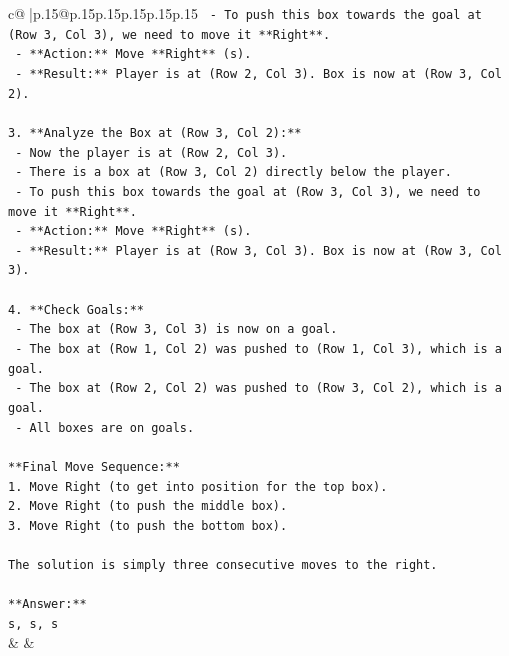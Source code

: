\documentclass{article}
\begin{document}
{\begin{supertabular}{c@{$\;$}|p{.15\linewidth}@{}p{.15\linewidth}p{.15\linewidth}p{.15\linewidth}p{.15\linewidth}p{.15\linewidth}}
{{{\texttt{    {-} To push this box towards the goal at (Row 3, Col 3), we need to move it **Right**.} \\
\texttt{    {-} **Action:** Move **Right** (s).} \\
\texttt{    {-} **Result:** Player is at (Row 2, Col 3). Box is now at (Row 3, Col 2).} \\
\\ 
\texttt{3.  **Analyze the Box at (Row 3, Col 2):**} \\
\texttt{    {-} Now the player is at (Row 2, Col 3).} \\
\texttt{    {-} There is a box at (Row 3, Col 2) directly below the player.} \\
\texttt{    {-} To push this box towards the goal at (Row 3, Col 3), we need to move it **Right**.} \\
\texttt{    {-} **Action:** Move **Right** (s).} \\
\texttt{    {-} **Result:** Player is at (Row 3, Col 3). Box is now at (Row 3, Col 3).} \\
\\ 
\texttt{4.  **Check Goals:**} \\
\texttt{    {-} The box at (Row 3, Col 3) is now on a goal.} \\
\texttt{    {-} The box at (Row 1, Col 2) was pushed to (Row 1, Col 3), which is a goal.} \\
\texttt{    {-} The box at (Row 2, Col 2) was pushed to (Row 3, Col 2), which is a goal.} \\
\texttt{    {-} All boxes are on goals.} \\
\\ 
\texttt{**Final Move Sequence:**} \\
\texttt{1.  Move Right (to get into position for the top box).} \\
\texttt{2.  Move Right (to push the middle box).} \\
\texttt{3.  Move Right (to push the bottom box).} \\
\\ 
\texttt{The solution is simply three consecutive moves to the right.} \\
\\ 
\texttt{**Answer:**} \\
\texttt{s, s, s} \\
            }
        }
    }
    & & \\ \\


\end{supertabular}}
\end{document}

